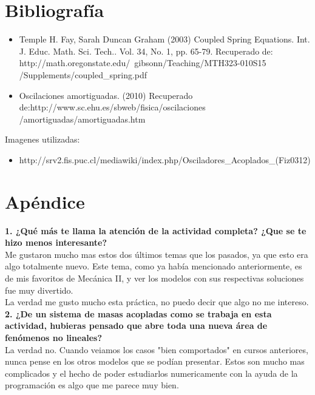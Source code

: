\documentclass[12pt]{article}
\begin{document}
\section{Bibliografía}
\begin{itemize}
    \item Temple H. Fay, Sarah Duncan Graham (2003) Coupled Spring Equations. Int. J. Educ. Math. Sci. Tech.. Vol. 34, No. 1, pp. 65-79. Recuperado de: http://math.oregonstate.edu/~gibsonn/Teaching/MTH323-010S15 \\ /Supplements/coupled\_spring.pdf
    \item Oscilaciones amortiguadas. (2010) Recuperado de:http://www.sc.ehu.es/sbweb/fisica/oscilaciones \\ /amortiguadas/amortiguadas.htm
\end{itemize}

Imagenes utilizadas:
\begin{itemize}
    \item http://srv2.fis.puc.cl/mediawiki/index.php/Osciladores\_Acoplados\_(Fiz0312)
\end{itemize}
\section{Apéndice}
\noindent\textbf {1. ¿Qué más te llama la atención de la actividad completa? ¿Que se te hizo menos interesante?} \\

Me gustaron mucho mas estos dos últimos temas que los pasados, ya que esto era algo totalmente nuevo. Este tema, como ya había mencionado anteriormente, es de mis favoritos de Mecánica II, y ver los modelos con sus respectivas soluciones fue muy divertido. \\

La verdad me gusto mucho esta práctica, no puedo decir que algo no me intereso. \\

\noindent\textbf {2. ¿De un sistema de masas acopladas como se trabaja en esta actividad, hubieras pensado que abre toda una nueva área de fenómenos no lineales? }\\

La verdad no. Cuando veiamos los casos "bien comportados" en cursos anteriores, nunca pense en los otros modelos que se podían presentar. Estos son mucho mas complicados y el hecho de poder estudiarlos numericamente con la ayuda de la programación es algo que me parece muy bien. \\ \\
\end{document}
